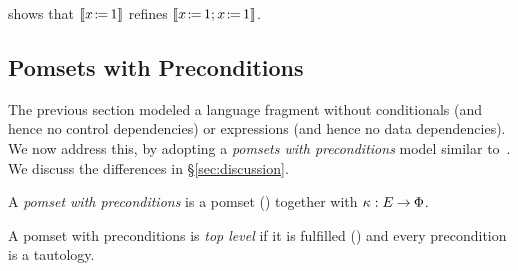 \begin{example}
   shows that $\sem{\PW{x}{1}}$ refines $\sem{\PW{x}{1}\SEMI\PW{x}{1}}$.
\end{example}

\subsection{Pomsets with Preconditions}
\label{sec:pomsets-pre}

The previous section modeled a language fragment without conditionals (and hence no
control dependencies) or expressions (and hence no data dependencies). We now
address this, by adopting a \emph{pomsets with preconditions} model
similar to~\cite{DBLP:journals/pacmpl/JagadeesanJR20}.
We discuss the differences in \S\ref{sec:discussion}.

\begin{definition}
  A \emph{pomset with preconditions} is
  a pomset () together with $\kappa:E\mathbin\rightarrow\Phi$.
\end{definition}

\begin{definition}
  A pomset with preconditions is \emph{top level} if it is fulfilled () and
  every precondition is a tautology.
\end{definition}


